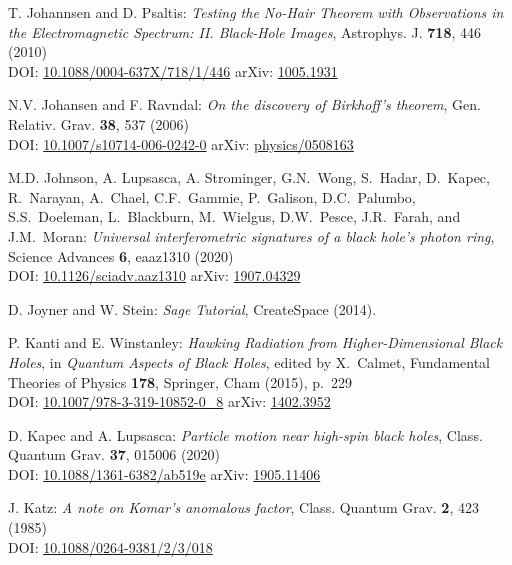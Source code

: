 \begin{thebibliography}{123}
T. Johannsen and D. Psaltis:
{\em Testing the No-Hair Theorem with Observations in the Electromagnetic Spectrum: II. Black-Hole Images},
Astrophys. J. {\bf 718}, 446 (2010)\\
DOI: \href{https://doi.org/10.1088/0004-637X/718/1/446}{10.1088/0004-637X/718/1/446}\hfill
arXiv: \href{https://arxiv.org/abs/1005.1931}{1005.1931}

N.V. Johansen and F. Ravndal:
{\em On the discovery of Birkhoff's theorem},
Gen. Relativ. Grav. {\bf 38}, 537 (2006)\\
DOI: \href{https://doi.org/10.1007/s10714-006-0242-0}{10.1007/s10714-006-0242-0}\hfill
arXiv: \href{https://arxiv.org/abs/physics/0508163}{physics/0508163}

M.D. Johnson, A. Lupsasca, A. Strominger, G.N.~Wong, S.~Hadar, D.~Kapec, R.~Narayan, A.~Chael,
C.F.~Gammie, P.~Galison, D.C.~Palumbo, S.S.~Doeleman, L.~Blackburn, M.~Wielgus, D.W.~Pesce,
J.R.~Farah, and J.M.~Moran:
{\em Universal interferometric signatures of a black hole's photon ring},
Science Advances {\bf 6}, eaaz1310 (2020)\\
DOI: \href{https://doi.org/10.1126/sciadv.aaz1310}{10.1126/sciadv.aaz1310}\hfill
arXiv: \href{https://arxiv.org/abs/1907.04329}{1907.04329}

D. Joyner and W. Stein: {\em Sage Tutorial}, CreateSpace (2014).

P. Kanti and E. Winstanley: {\em Hawking Radiation from Higher-Dimensional Black Holes},
in {\em Quantum Aspects of Black Holes}, edited by X.~Calmet,
Fundamental Theories of Physics {\bf 178},
Springer, Cham (2015), p.~229\\
DOI: \href{https://doi.org/10.1007/978-3-319-10852-0_8}{10.1007/978-3-319-10852-0\_8}\hfill
arXiv: \href{https://arxiv.org/abs/1402.3952}{1402.3952}

D. Kapec and A. Lupsasca:
{\em Particle motion near high-spin black holes},
Class. Quantum Grav. {\bf 37}, 015006 (2020)\\
DOI: \href{https://doi.org/10.1088/1361-6382/ab519e}{10.1088/1361-6382/ab519e}\hfill
arXiv: \href{https://arxiv.org/abs/1905.11406}{1905.11406}

J. Katz:
{\em A note on Komar's anomalous factor},
Class. Quantum Grav. {\bf 2}, 423 (1985)\\
DOI: \href{https://doi.org/10.1088/0264-9381/2/3/018}{10.1088/0264-9381/2/3/018}


\end{thebibliography}
